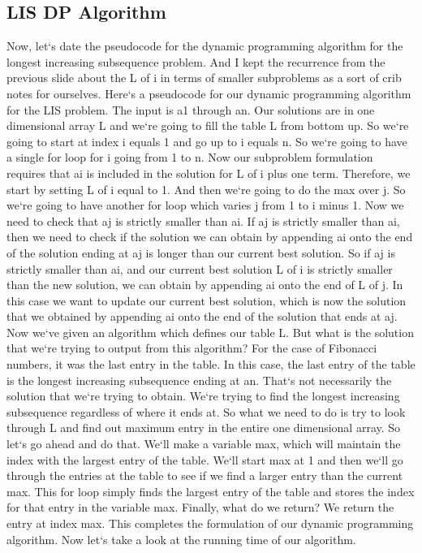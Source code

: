 \subsection{LIS  DP Algorithm}
Now, let`s date the pseudocode for the dynamic programming algorithm for the longest increasing subsequence problem.
And I kept the recurrence from the previous slide about the L of i in terms of smaller subproblems as a sort of crib notes for ourselves.
Here`s a pseudocode for our dynamic programming algorithm for the LIS problem.
The input is a1 through an.
Our solutions are in one dimensional array L and we`re going to fill the table L from bottom up.
So we`re going to start at index i equals 1 and go up to i equals n.
So we`re going to have a single for loop for i going from 1 to n.
Now our subproblem formulation requires that ai is included in the solution for L of i plus one term.
Therefore, we start by setting L of i equal to 1.
And then we`re going to do the max over j.
So we`re going to have another for loop which varies j from 1 to i minus 1.
Now we need to check that aj is strictly smaller than ai.
If aj is strictly smaller than ai, then we need to check if the solution we can obtain by appending ai onto the end of the solution ending at aj is longer than our current best solution.
So if aj is strictly smaller than ai, and our current best solution L of i is strictly smaller than the new solution, we can obtain by appending ai onto the end of L of j.
In this case we want to update our current best solution, which is now the solution that we obtained by appending ai onto the end of the solution that ends at aj.
Now we`ve given an algorithm which defines our table L\@.
But what is the solution that we`re trying to output from this algorithm? For the case of Fibonacci numbers, it was the last entry in the table.
In this case, the last entry of the table is the longest increasing subsequence ending at an.
That`s not necessarily the solution that we`re trying to obtain.
We`re trying to find the longest increasing subsequence regardless of where it ends at.
So what we need to do is try to look through L and find out maximum entry in the entire one dimensional array.
So let`s go ahead and do that.
We`ll make a variable max, which will maintain the index with the largest entry of the table.
We`ll start max at 1 and then we`ll go through the entries at the table to see if we find a larger entry than the current max.
This for loop simply finds the largest entry of the table and stores the index for that entry in the variable max.
Finally, what do we return? We return the entry at index max.
This completes the formulation of our dynamic programming algorithm.
Now let`s take a look at the running time of our algorithm.

